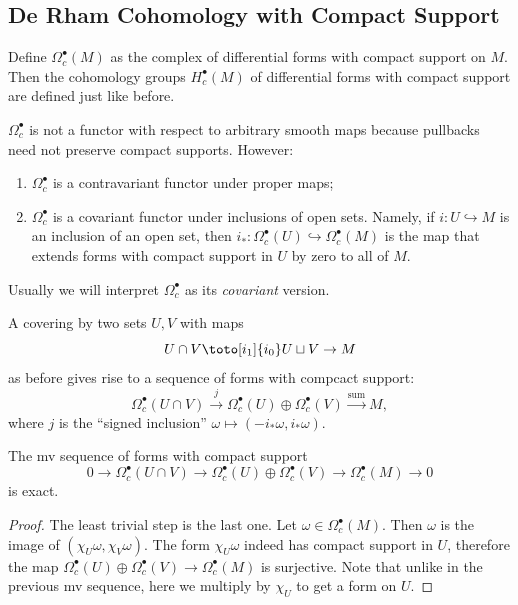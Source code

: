 \documentclass[english,letterpaper]{article}%
\numberwithin{equation}{section}
\numberwithin{figure}{section}
\numberwithin{table}{section}
\theoremstyle{definition}
\theoremstyle{definition}
\theoremstyle{definition}
\theoremstyle{plain}
\theoremstyle{plain}
\theoremstyle{plain}
\theoremstyle{plain}
\theoremstyle{remark}
\theoremstyle{remark}
\def\red{\color{red}}
\newcommand{\PRLsep}{   %
           \noindent\makebox[\linewidth]{
                \resizebox{0.5\linewidth}{1pt}{$\blacklozenge$}}}
\begin{document}

\subsection{De Rham Cohomology with Compact Support}

\begin{defn}
    Define $\Omega_c^\bullet(M)$ as the complex of differential forms with compact support on $M$. Then the cohomology groups $H_c^\bullet(M)$ of differential forms with compact support are defined just like before.
\end{defn}

\begin{prop}
    $\Omega_c^\bullet$ is not a functor with respect to arbitrary smooth maps because pullbacks need not preserve compact supports. However:
    \begin{enumerate}
        \item $\Omega_c^\bullet$ is a contravariant functor under proper maps;
        \item $\Omega_c^\bullet$ is a covariant functor under inclusions of open sets. Namely, if $i:U\hookrightarrow M$ is an inclusion of an open set, then $i_\ast:\Omega_c^\bullet(U)\hookrightarrow\Omega_c^\bullet(M)$ is the map that extends forms with compact support in $U$ by zero to all of $M$.
    \end{enumerate}
\end{prop}
Usually we will interpret $\Omega_c^\bullet$ as its \emph{covariant} version.

A covering by two sets $U,V$ with maps 
\[U\cap V\toto[i_1]{i_0}U\sqcup V\to M \]
as before gives rise to a sequence of forms with compcact support:
\[\Omega_c^\bullet(U\cap V)\overset{j}{\to} \Omega_c^\bullet(U)\oplus\Omega_c^\bullet(V)\overset{\text{sum}}\to M ,\]
where $j$ is the ``signed inclusion'' $\omega\mapsto (-i_\ast \omega,i_\ast\omega)$.

\begin{prop}
    The \gls{mv} sequence of forms with compact support
    \[0\to \Omega_c^\bullet(U\cap V)\to \Omega_c^\bullet(U)\oplus\Omega_c^\bullet(V)\to \Omega_c^\bullet(M)\to 0\]
    is exact.
\end{prop}
\begin{proof}
    The least trivial step is the last one. Let $\omega\in\Omega_c^\bullet(M)$. Then $\omega$ is the image of $(\chi_U\omega,\chi_V\omega)$. The form $\chi_U\omega$ indeed has compact support in $U$, therefore the map $\Omega_c^\bullet(U)\oplus\Omega_c^\bullet(V)\to \Omega_c^\bullet(M)$ is surjective. Note that unlike in the previous \gls{mv} sequence, here we multiply by $\chi_U$ to get a form on $U$.
\end{proof}
\end{document}
